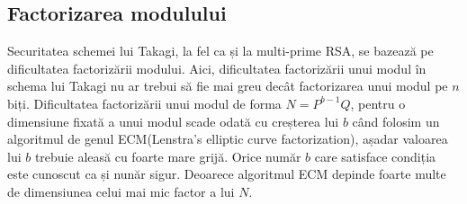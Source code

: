 \documentclass[12]{report}
\begin{document}
\subsection{Factorizarea modulului}
Securitatea schemei lui Takagi, la fel ca și la multi-prime RSA, se bazează pe dificultatea factorizării modului. Aici, dificultatea factorizării unui modul în schema lui Takagi nu ar trebui să fie mai greu decât factorizarea unui modul pe $n$ biți. Dificultatea factorizării unui modul de forma $N=P^{b-1}Q$, pentru o dimensiune fixată a unui modul scade odată cu creșterea lui $b$ când folosim un algoritmul de genul ECM(Lenstra's elliptic curve factorization), așadar valoarea lui $b$ trebuie aleasă cu foarte mare grijă. Orice număr $b$ care satisface condiția este cunoscut ca și nunăr sigur. Deoarece algoritmul ECM depinde foarte multe de dimensiunea celui mai mic factor a lui $N$. 
\end{document}
